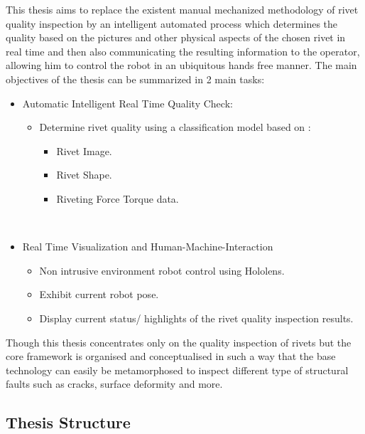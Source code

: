\documentclass{article}
\begin{document}
This thesis aims to replace the existent manual mechanized methodology of rivet quality inspection by an intelligent automated process which determines the quality based on the pictures and other physical aspects of the chosen rivet in real time and then also communicating the resulting information to the operator, allowing him to control the robot in an ubiquitous hands free manner.\newline
The main objectives of the thesis can be summarized in 2 main tasks:\\
\begin{itemize}
\item Automatic Intelligent Real Time Quality Check:
\begin{itemize}
    \item Determine rivet quality using a classification model based on :
    \begin{itemize}
    \item Rivet Image.
    \item Rivet Shape.
    \item Riveting Force Torque data.
    \end{itemize}
\end{itemize}\\
\item Real Time Visualization and Human-Machine-Interaction
\begin{itemize}
    \item Non intrusive environment robot control using Hololens.
    \item Exhibit current robot pose.
    \item Display current status/ highlights of the rivet quality inspection results.

\end{itemize}
\end{itemize}
Though this thesis concentrates only on the quality inspection of rivets but the core framework is organised and conceptualised in such a way that the base technology can easily be metamorphosed to inspect different type of structural faults such as cracks, surface deformity and more.

\subsection{Thesis Structure}
\end{document}
